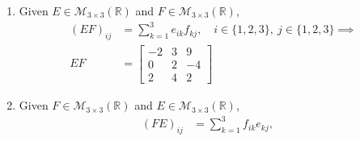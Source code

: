 \begin{enumerate}[label=\Alph*)]
\begin{answer}
$$\begin{aligned}
                (DA)_{11}
                    &= \sum_{k=1}^{3} d_{1k}a_{k1}
                    = 1(2)+2(3)+3(-1) = 5, \\[0.5em]
                (DA)_{12}
                    &= \sum_{k=1}^{3} d_{1k}a_{k2}
                    = 1(2)+2(3)+3(-1) = 5, \\[0.5em]
                (DA)_{21}
                    &= \sum_{k=1}^{3} d_{2k}a_{k1}
                    = 3(2)+1(3)+(-2)(-1) = 11, \\[0.5em]
                (DA)_{22}
                    &= \sum_{k=1}^{3} d_{2k}a_{k2}
                    = 3(2)+1(3)+(-2)(-1) = 11 \implies \\[0.5em]
                \implies
                DA & = \begin{bmatrix}
                    5 & 5 \\
                    11 & 11
                \end{bmatrix}
            \end{aligned}$$
            \end{answer}
            \item \begin{answer} %
                Given $E \in \mathcal{M}_{3 \times 3}(\mathbb{R})$ and
                    $F \in \mathcal{M}_{3 \times 3}(\mathbb{R})$,
                    $$\begin{aligned}
                        (EF)_{ij}
                            & = \sum_{k=1}^{3} e_{ik}f_{kj},
                            \quad
                            i \in \{1,2,3\},\ j \in \{1,2,3\} \implies \\[0.5em]
                        EF & = \begin{bmatrix}
                            -2 & 3 & 9 \\
                            0 & 2 & -4 \\
                            2 & 4 & 2
                        \end{bmatrix}
                    \end{aligned}$$
            \end{answer}
            \item \begin{answer} %
                Given $F \in \mathcal{M}_{3 \times 3}(\mathbb{R})$ and
                    $E \in \mathcal{M}_{3 \times 3}(\mathbb{R})$,
                    $$\begin{aligned}
                        (FE)_{ij} & = \sum_{k=1}^{3} f_{ik}e_{kj},
                        \quad

\end{aligned}$$
\end{answer}
\end{enumerate}
